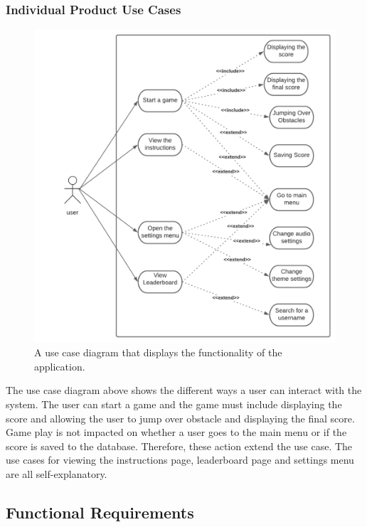 \documentclass[12pt]{article}
\begin{document}
\vskip1cm



\subsubsection{Individual Product Use Cases}

\begin{figure}[!ht]
    \centering
    \includegraphics{use_case.png}
    \caption{A use case diagram that displays the functionality of the application.}
\end{figure}

The use case diagram above shows the different ways a user can interact with the system. The user can start a game and the game must include displaying the score and allowing the user to jump over obstacle and displaying the final score. Game play is not impacted on whether a user goes to the main menu or if the score is saved to the database. Therefore, these action extend the use case. The use cases for viewing the instructions page, leaderboard page and settings menu are all self-explanatory. 



\subsection{Functional Requirements}
\end{document}
